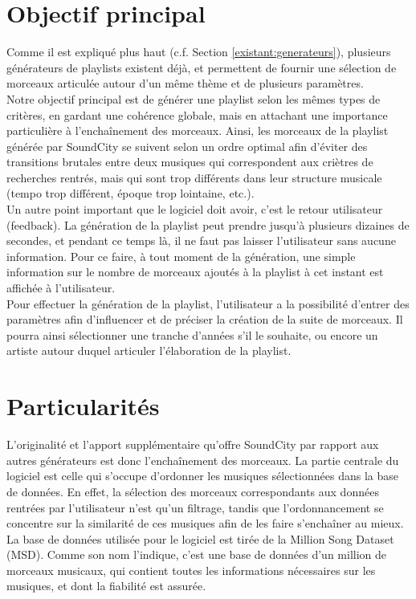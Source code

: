 
\section{Objectif principal}
\label{objectifs:principal}

Comme il est expliqué plus haut (c.f. Section \ref{existant:generateurs}), 
plusieurs générateurs de playlists existent déjà, et permettent de fournir une 
sélection de morceaux articulée autour d'un même thème et de plusieurs 
paramètres.\\

Notre objectif principal est de générer une playlist selon les mêmes types 
de critères, en gardant une cohérence globale, mais en attachant une 
importance particulière à l'enchaînement des morceaux. Ainsi, les morceaux 
de la playlist générée par SoundCity se suivent selon un ordre optimal afin 
d'éviter des transitions brutales entre deux musiques qui correspondent aux 
criètres de recherches rentrés, mais qui sont trop différents dans leur 
structure musicale (tempo trop différent, époque trop lointaine, etc.).\\

Un autre point important que le logiciel doit avoir, c'est le retour 
utilisateur (feedback). La génération de la playlist peut prendre jusqu'à 
plusieurs dizaines de secondes, et pendant ce temps là, il ne faut pas 
laisser l'utilisateur sans aucune information. Pour ce faire, à tout moment 
de la génération, une simple information sur le nombre de morceaux ajoutés à 
la playlist à cet instant est affichée à l'utilisateur.\\

Pour effectuer la génération de la playlist, l'utilisateur a la possibilité 
d'entrer des paramètres afin d'influencer et de préciser la création de la 
suite de morceaux. Il pourra ainsi sélectionner une tranche d'années s'il le 
souhaite, ou encore un artiste autour duquel articuler l'élaboration de la 
playlist.


\section{Particularités}
\label{objectifs:particularites}

L'originalité et l'apport supplémentaire qu'offre SoundCity par rapport aux 
autres générateurs est donc l'enchaînement des morceaux. La partie centrale 
du logiciel est celle qui s'occupe d'ordonner les musiques sélectionnées 
dans la base de données. En effet, la sélection des morceaux correspondants 
aux données rentrées par l'utilisateur n'est qu'un filtrage, tandis que 
l'ordonnancement se concentre sur la similarité de ces musiques afin de les 
faire s'enchaîner au mieux.\\

La base de données utilisée pour le logiciel est tirée de la Million Song 
Dataset (MSD). Comme son nom l'indique, c'est une base de données d'un 
million de morceaux musicaux, qui contient toutes les informations 
nécessaires sur les musiques, et dont la fiabilité est assurée.
